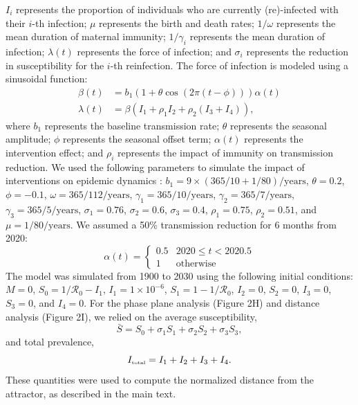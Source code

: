 \documentclass[12pt]{article}
\newcommand{\tsub}[2]{#1_{{\textrm{\tiny #2}}}}
\begin{document}
$I_i$ represents the proportion of individuals who are currently (re)-infected with their $i$-th infection;
$\mu$ represents the birth and death rates;
$1/\omega$ represents the mean duration of maternal immunity;
$1/\gamma_i$ represents the mean duration of infection;
$\lambda(t)$ represents the force of infection;
and $\sigma_i$ represents the reduction in susceptibility for the $i$-th reinfection.
The force of infection is modeled using a sinusoidal function:
\begin{align}
\beta(t) &= b_1 (1 + \theta \cos(2 \pi (t-\phi))) \alpha(t)\\
\lambda(t) &= \beta (I_1 + \rho_1 I_2 + \rho_2 (I_3 + I_4)), 
\end{align}
where $b_1$ represents the baseline transmission rate; $\theta$ represents the seasonal amplitude; $\phi$ represents the seasonal offset term; $\alpha(t)$ represents the intervention effect; and $\rho_i$ represents the impact of immunity on transmission reduction.
We used the following parameters to simulate the impact of interventions on epidemic dynamics \citep{pitzer2015environmental}: $b_1 = 9 \times (365/10+1/80)/\mathrm{years}$, $\theta = 0.2$, $\phi = -0.1$, $\omega=365/112/\mathrm{years}$, $\gamma_1=365/10/\mathrm{years}$, $\gamma_2=365/7/\mathrm{years}$, $\gamma_3=365/5/\mathrm{years}$, $\sigma_1 = 0.76$, $\sigma_2 = 0.6$, $\sigma_3 = 0.4$, $\rho_1 = 0.75$, $\rho_2 = 0.51$, and $\mu = 1/80/\mathrm{years}$.
We assumed a 50\% transmission reduction for 6 months from 2020:
\begin{equation}
\alpha(t) = \begin{cases}
0.5 & 2020 \leq t< 2020.5\\
1 & \textrm{otherwise}
\end{cases}
\end{equation}
The model was simulated from 1900 to 2030 using the following initial conditions: $M=0$, $S_0=1/\mathcal R_0-I_1$, $I_1=1\times 10^{-6}$, $S_1=1-1/\mathcal R_0$, $I_2=0$, $S_2=0$, $I_3=0$, $S_3=0$, and $I_4=0$.
For the phase plane analysis (Figure 2H) and distance analysis (Figure 2I), we relied on the average susceptibility,
\begin{equation}
\bar{S} = S_0 + \sigma_1 S_1 + \sigma_2 S_2 + \sigma_3 S_3,
\end{equation}
and total prevalence,
\begin{equation}
\tsub{I}{total} = I_1 + I_2 + I_3 + I_4.
\end{equation}
These quantities were used to compute the normalized distance from the attractor, as described in the main text.
\end{document}
